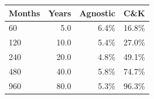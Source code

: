 \begin{tabular}{lrrr}
\toprule
Months & Years & Agnostic & C\&K \\
\midrule
60 & 5.0 & 6.4\% & 16.8\% \\
120 & 10.0 & 5.4\% & 27.0\% \\
240 & 20.0 & 4.8\% & 49.1\% \\
480 & 40.0 & 5.8\% & 74.7\% \\
960 & 80.0 & 5.3\% & 96.3\% \\
\bottomrule
\end{tabular}

